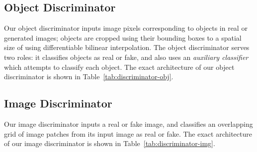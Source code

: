 \documentclass[10pt,twocolumn,letterpaper]{article}
\begin{document}
\subsection{Object Discriminator}
Our object discriminator  inputs image pixels corresponding to objects in
real or generated images; objects are cropped using their bounding boxes to a spatial
size of  using differentiable bilinear interpolation. The object discriminator
serves two roles: it classifies objects as real or fake, and also uses an \emph{auxiliary classifier}
which attempts to classify each object. The exact architecture of our object discriminator
is shown in Table~\ref{tab:discriminator-obj}.

\begin{table}
  \centering
  \setlength{\tabcolsep}{1mm}
  \vspace{1mm}
  \caption{
    Architecture of our object discriminator . The input to the object discriminator
    is a  crop of an object in either a generated or real image. The object
    discriminator outputs both a score for real / fake (11) and a classification score over the
    object categories  (12). In this model all convolution layers have stride 2 and
    no zero padding. LeakyReLU uses a negative slope of 0.2.
  }
  \label{tab:discriminator-obj}
\end{table}

\subsection{Image Discriminator}
Our image discriminator  inputs a real or fake image, and classifies an
overlapping grid of  image patches from its input image as real or fake.
The exact architecture of our image discriminator is shown in Table~\ref{tab:discriminator-img}.
\end{document}
